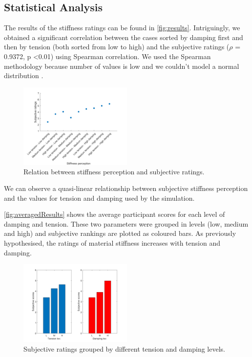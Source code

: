 \documentclass{article}
\begin{document}
\subsection{Statistical Analysis}
The results of the stiffness ratings can be found in \autoref{fig:results}. Intriguingly, we obtained a significant correlation between the cases sorted by damping first and then by tension (both sorted from low to high) and the subjective ratings ($\rho$ = 0.9372, p \textless  0.01) using Spearman correlation. We used the Spearman methodology because number of values is low and we couldn't model a normal distribution \cite{Kirk2007}.%
\begin{figure}[t]
\includegraphics[width=0.5\textwidth]{Images/corr_anal}
\caption{Relation between stiffness perception and subjective ratings.}
\centering
\label{fig:results}
\end{figure} 
We can observe a quasi-linear relationship between subjective stiffness perception and the values for tension and damping used by the simulation. %

\autoref{fig:averagedResults} shows the average participant scores for each level of damping and tension. These two parameters were grouped in levels (low, medium and high) and subjective rankings are plotted as coloured bars. As previously hypothesised, the ratings of material stiffness increases with tension and damping.
\begin{figure}[t]
\includegraphics[width=0.5\textwidth]{Images/tens_dump}
\caption{Subjective ratings grouped by different tension and damping levels.}
\centering
\label{fig:averagedResults}
\end{figure} 
\end{document}
